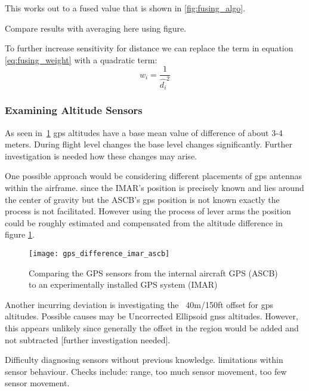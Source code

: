 This works out to a fused value that is shown in \ref{fig:fusing_algo}.

Compare results with averaging here using figure.

To further increase sensitivity for distance we can replace the term in equation \ref{eq:fusing_weight} with a quadratic term:
\begin{equation}
    w_i=\frac{1}{\hat{d_i}^2}
\end{equation}

















\subsubsection{Examining Altitude Sensors}
As seen in~\ref{fig:gps_diff} gps altitudes have a base mean value of difference of about 3-4 meters. During flight level changes the base level changes significantly. Further investigation is needed how these changes may arise.

One possible approach would be considering different placements of gps antennas within the airframe. since the IMAR's position is precisely known and lies around the center of gravity but the ASCB's gps position is not known exactly the process is not facilitated. However using the process of lever arms the position could be roughly estimated and compensated from the altitude difference in figure \ref{fig:gps_diff}.

\begin{figure}[h]
    \centering
    \texttt{[image: gps\_difference\_imar\_ascb]}
    \caption{Comparing the GPS sensors from the internal aircraft GPS (ASCB) to an experimentally installed GPS system (IMAR)}
    \label{fig:gps_diff}
\end{figure}

Another incurring deviation is investigating the ~40m/150ft offset for gps altitudes. Possible causes may be Uncorrected Ellipsoid gnss altitudes. However, this appears unlikely since generally the offset in the region would be added and not subtracted [further investigation needed].


Difficulty diagnosing sensors without previous knowledge. limitations within sensor behaviour. Checks include: range, too much sensor movement, too few sensor movement.

